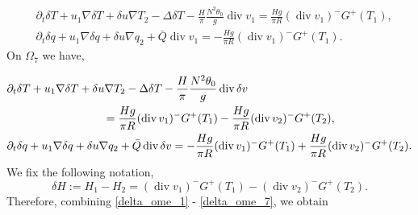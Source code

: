 \documentclass[11pt, a4paper, article,reqno,]{amsart}
\theoremstyle{remark}
\DeclareMathOperator{\dive}{div}
\numberwithin{equation}{section}
\begin{document}
\begin{equation}\label{delta_ome_6}
    \begin{aligned}
        & \partial_t \delta T + u_1 \nabla \delta T + \delta u \nabla T_{2} - \Delta \delta T - \frac{H}{\pi}\frac{N^2 \theta_0}{g} \dive v_1= \frac{Hg}{\pi R}(\dive v_1)^-G^+(T_1), \\
        & \partial_t \delta q + u_1 \nabla \delta q + \delta u \nabla q_2 + \bar{Q} \dive v_1= -\frac{Hg}{\pi R}(\dive v_1)^-G^+(T_1).
    \end{aligned}
\end{equation}
On $\Omega_7$ we have,

\begin{equation}\label{delta_ome_7}
    \begin{aligned}
         & \partial_t \delta T + u_1 \nabla \delta T + \delta u \nabla T_{2} - \Delta \delta T - \frac{H}{\pi}\frac{N^2 \theta_0}{g} \dive \delta v \\
         & \hspace{+ 3.cm}= \frac{Hg}{\pi R}(\dive v_1)^-G^+(T_1) - \frac{Hg}{\pi R}(\dive v_2)^-G^+(T_2),\\
        & \partial_t \delta q + u_1 \nabla \delta q + \delta u \nabla q_2 + \bar{Q} \dive \delta v = -\frac{Hg}{\pi R}(\dive v_1)^-G^+(T_1) + \frac{Hg}{\pi R}(\dive v_2)^-G^+(T_2).
    \end{aligned}
\end{equation}
We fix the following notation,
\begin{equation*}
    \delta H := H_1 - H_2 =  (\dive v_1)^-G^+(T_1) - (\dive v_2)^-G^+(T_2).
\end{equation*}
Therefore, combining \eqref{delta_ome_1} - \eqref{delta_ome_7}, we obtain
\end{document}
